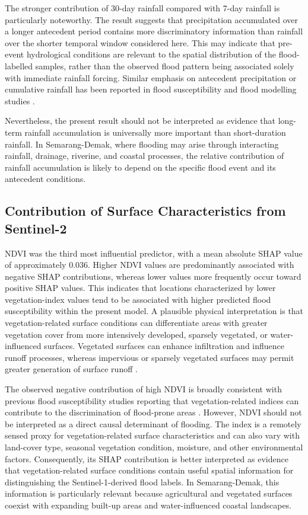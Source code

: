 \documentclass[11pt,twoside]{article}
\begin{document}
The stronger contribution of 30-day rainfall compared with 7-day rainfall is particularly noteworthy. The result suggests that precipitation accumulated over a longer antecedent period contains more discriminatory information than rainfall over the shorter temporal window considered here. This may indicate that pre-event hydrological conditions are relevant to the spatial distribution of the flood-labelled samples, rather than the observed flood pattern being associated solely with immediate rainfall forcing. Similar emphasis on antecedent precipitation or cumulative rainfall has been reported in flood susceptibility and flood modelling studies \cite{Zhao2025}.

Nevertheless, the present result should not be interpreted as evidence that long-term rainfall accumulation is universally more important than short-duration rainfall. In Semarang-Demak, where flooding may arise through interacting rainfall, drainage, riverine, and coastal processes, the relative contribution of rainfall accumulation is likely to depend on the specific flood event and its antecedent conditions.

\subsection{Contribution of Surface Characteristics from Sentinel-2}\label{contribution-sentinel2}

NDVI was the third most influential predictor, with a mean absolute SHAP value of approximately 0.036. Higher NDVI values are predominantly associated with negative SHAP contributions, whereas lower values more frequently occur toward positive SHAP values. This indicates that locations characterized by lower vegetation-index values tend to be associated with higher predicted flood susceptibility within the present model. A plausible physical interpretation is that vegetation-related surface conditions can differentiate areas with greater vegetation cover from more intensively developed, sparsely vegetated, or water-influenced surfaces. Vegetated surfaces can enhance infiltration and influence runoff processes, whereas impervious or sparsely vegetated surfaces may permit greater generation of surface runoff \cite{Aniramu2026}.

The observed negative contribution of high NDVI is broadly consistent with previous flood susceptibility studies reporting that vegetation-related indices can contribute to the discrimination of flood-prone areas \cite{Rahimi2026}. However, NDVI should not be interpreted as a direct causal determinant of flooding. The index is a remotely sensed proxy for vegetation-related surface characteristics and can also vary with land-cover type, seasonal vegetation condition, moisture, and other environmental factors. Consequently, its SHAP contribution is better interpreted as evidence that vegetation-related surface conditions contain useful spatial information for distinguishing the Sentinel-1-derived flood labels. In Semarang-Demak, this information is particularly relevant because agricultural and vegetated surfaces coexist with expanding built-up areas and water-influenced coastal landscapes.
\end{document}
